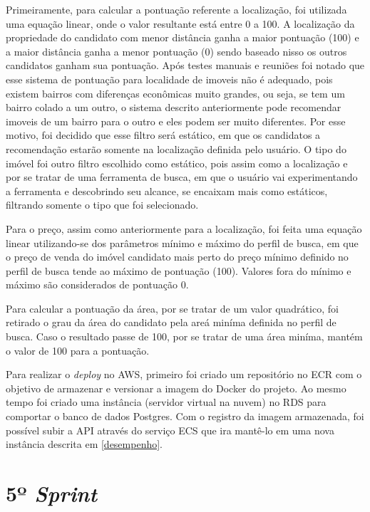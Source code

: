 Primeiramente, para calcular a pontuação referente a localização, foi utilizada uma equação linear, onde o valor resultante está entre 0 a 100. A localização da propriedade do candidato com menor distância ganha a maior pontuação (100) e a maior distância ganha a menor pontuação (0) sendo baseado nisso os outros candidatos ganham sua pontuação. Após testes manuais e reuniões foi notado que esse sistema de pontuação para localidade de imoveis não é adequado, pois existem bairros com diferenças econômicas muito grandes, ou seja, se tem um bairro colado a um outro, o sistema descrito anteriormente pode recomendar imoveis de um bairro para o outro e eles podem ser muito diferentes. Por esse motivo, foi decidido que esse filtro será estático, em que os candidatos a recomendação estarão somente na localização definida pelo usuário. O tipo do imóvel foi outro filtro escolhido como estático, pois assim como a localização e por se tratar de uma ferramenta de busca, em que o usuário vai experimentando a ferramenta e descobrindo seu alcance, se encaixam mais como estáticos, filtrando somente o tipo que foi selecionado.

Para o preço, assim como anteriormente para a localização, foi feita uma equação linear utilizando-se dos parâmetros mínimo e máximo do perfil de busca, em que o preço de venda do imóvel candidato mais perto do preço mínimo definido no perfil de busca tende ao máximo de pontuação (100). Valores fora do mínimo e máximo são considerados de pontuação 0.

Para calcular a pontuação da área, por se tratar de um valor quadrático, foi retirado o grau da área do candidato pela areá miníma definida no perfil de busca. Caso o resultado passe de 100, por se tratar de uma área miníma, mantém o valor de 100 para a pontuação.

Para realizar o \textit{deploy} no AWS, primeiro foi criado um repositório no ECR com o objetivo de armazenar e versionar a imagem do Docker do projeto. Ao mesmo tempo foi criado uma instância (servidor virtual na nuvem) no RDS para comportar o banco de dados Postgres. Com o registro da imagem armazenada, foi possível subir a API através do serviço ECS que ira mantê-lo em uma nova instância descrita em \ref{desempenho}.


\section{5º \textit{Sprint}}

